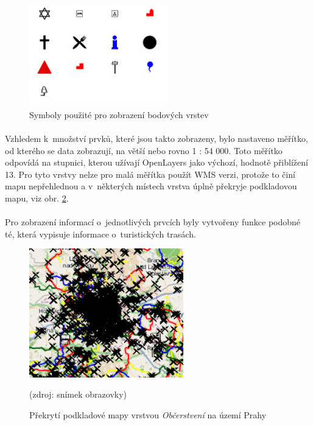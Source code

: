 \documentclass[11pt,a4paper,titlepage,oneside]{book}
\begin{document}

		\begin{figure}[!h]
			\begin{center}
				\includegraphics[width=6cm]{obrazky/toulavej/symbols.png}
				\caption{Symboly použité pro zobrazení bodových vrstev}
				\label{fig:symboly}
			\end{center}
		\end{figure}	

			\paragraph{}Vzhledem k~množství prvků, které jsou takto zobrazeny, bylo nastaveno měřítko, od kterého se data zobrazují, na větší nebo rovno 1 : 54 000. Toto měřítko odpovídá na stupnici, kterou užívají OpenLayers jako výchozí, hodnotě přiblížení 13. Pro tyto vrstvy nelze pro malá měřítka použít \ac{WMS} verzi, protože to činí mapu nepřehlednou a v~některých místech vrstva úplně překryje podkladovou mapu, viz obr. \ref{fig:food}.
		
		\paragraph{}Pro zobrazení informací o~jednotlivých prvcích byly vytvořeny funkce podobné té, která vypisuje informace o~turistických trasách.


\begin{figure}[!h]
			\begin{center}
				\includegraphics[width=6.7cm]{obrazky/toulavej/food.png}
				\caption{Překrytí podkladové mapy vrstvou  \textit{Občerstvení} na území Prahy}
				\label{fig:food}
				(zdroj: snímek obrazovky)
			\end{center}
		\end{figure}	
\end{document}
